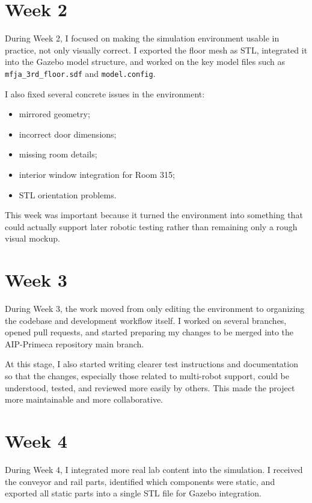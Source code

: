 \documentclass[11pt,a4paper]{article}
\begin{document}
\section*{Week 2}

During Week 2, I focused on making the simulation environment usable in
practice, not only visually correct. I exported the floor mesh as STL,
integrated it into the Gazebo model structure, and worked on the key model
files such as \texttt{mfja\_3rd\_floor.sdf} and \texttt{model.config}.

I also fixed several concrete issues in the environment:

\begin{itemize}
\item mirrored geometry;
\item incorrect door dimensions;
\item missing room details;
\item interior window integration for Room 315;
\item STL orientation problems.
\end{itemize}

This week was important because it turned the environment into something that
could actually support later robotic testing rather than remaining only a rough
visual mockup.

\section*{Week 3}

During Week 3, the work moved from only editing the environment to organizing
the codebase and development workflow itself. I worked on several branches,
opened pull requests, and started preparing my changes to be merged into the
AIP-Primeca repository main branch.

At this stage, I also started writing clearer test instructions and
documentation so that the changes, especially those related to multi-robot
support, could be understood, tested, and reviewed more easily by others. This
made the project more maintainable and more collaborative.

\section*{Week 4}

During Week 4, I integrated more real lab content into the simulation. I
received the conveyor and rail parts, identified which components were static,
and exported all static parts into a single STL file for Gazebo integration.
\end{document}
